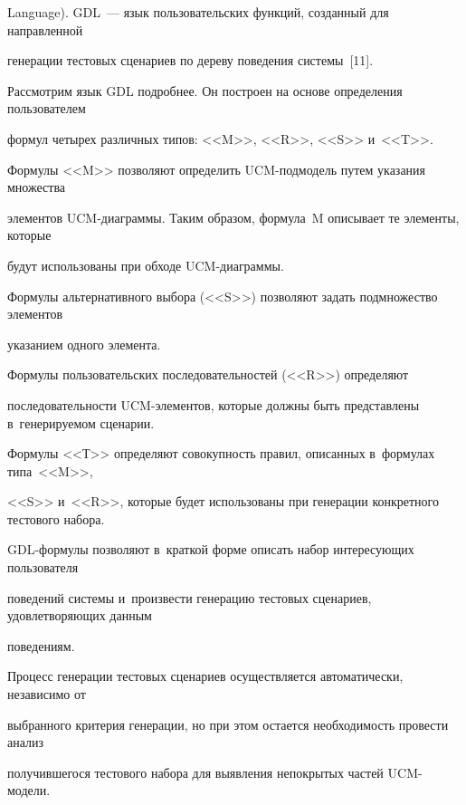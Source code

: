 Language). GDL~--- язык пользовательских функций, созданный для направленной

генерации тестовых сценариев по дереву поведения системы~[11].



  Рассмотрим язык GDL подробнее. Он построен на основе определения пользователем

формул четырех различных типов: <<M>>, <<R>>, <<S>> и~<<T>>.



  Формулы <<M>> позволяют определить UCM-под\-мо\-дель путем указания множества

элементов UCM-диа\-грам\-мы. Таким образом, формула~M описывает те элементы, которые

будут использованы при обходе UCM-диаграммы.



  Формулы альтернативного выбора (<<S>>) позволяют задать подмножество элементов

указанием одного элемента.



  Формулы пользовательских последовательностей (<<R>>) определяют

последовательности UCM-эле\-мен\-тов, которые должны быть представлены в~генерируемом сценарии.



  Формулы <<Т>> определяют совокупность правил, описанных в~формулах типа~<<M>>,

<<S>> и~<<R>>, которые будет использованы при генерации конкретного тестового набора.



  GDL-формулы позволяют в~краткой форме описать набор интересующих пользователя

поведений системы и~произвести генерацию тестовых сценариев, удовлетворяющих данным

поведениям.



  Процесс генерации тестовых сценариев осуществляется автоматически, независимо от

выбранного критерия генерации, но при этом остается необходимость провести анализ

получившегося тестового набора для выявления непокрытых частей UCM-мо\-дели.



\vspace*{-3pt}



